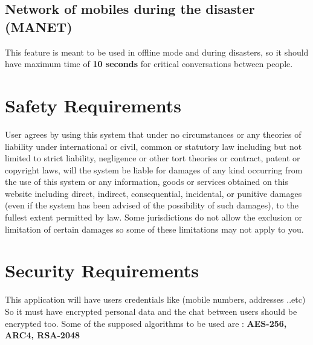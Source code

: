 \documentclass{scrreprt}
\begin{document}
\subsection{Network of mobiles during the disaster (MANET)}
This feature is meant to be used in offline mode and during disasters, so it should have maximum time of \textbf{10 seconds} for critical conversations between people.


\section{Safety Requirements}

User agrees by using this system that under no circumstances or any theories of liability under international or civil, common or statutory law including but not limited to strict liability, negligence or other tort theories or contract, patent or copyright laws, will the system be liable for damages of any kind occurring from the use of this system or any information, goods or services obtained on this website including direct, indirect, consequential, incidental, or punitive damages (even if the system has been advised of the possibility of such damages), to the fullest extent permitted by law. Some jurisdictions do not allow the exclusion or limitation of certain damages so some of these limitations may not apply to you.




\section{Security Requirements}
This application will have users credentials like (mobile numbers, addresses ..etc)
So it must have encrypted personal data and the chat between users should be encrypted too.
Some of the supposed algorithms to be used are : \textbf{AES-256, ARC4, RSA-2048}
\end{document}
